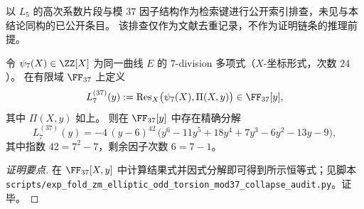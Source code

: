 \begin{remark}[公开索引一致性排查]
以 \(L_{5}\) 的高次系数片段与模 \(37\) 因子结构作为检索键进行公开索引排查，未见与本结论同构的已公开条目。
该排查仅作为文献去重记录，不作为证明链条的推理前提。
\end{remark}

\begin{conclusion}\label{con:xi-terminal-zm-elliptic-7torsion-y-image-mod37-collapse}
令 \(\psi_{7}(X)\in\ZZ[X]\) 为同一曲线 \(E\) 的 \(7\)-division 多项式（\(X\)-坐标形式，次数 \(24\)）。
在有限域 \(\FF_{37}\) 上定义
\[
L_{7}^{(37)}(y):=\operatorname{Res}_{X}\bigl(\psi_{7}(X),\Pi(X,y)\bigr)\in\FF_{37}[y],
\]
其中 \(\Pi(X,y)\) 如上。
则在 \(\FF_{37}[y]\) 中存在精确分解
\[
L_{7}^{(37)}(y)= -4\,(y-6)^{42}\,\bigl(y^{6}-11y^{5}+18y^{4}+7y^{3}-6y^{2}-13y-9\bigr),
\]
其中指数 \(42=7^{2}-7\)，剩余因子次数 \(6=7-1\)。
\end{conclusion}
\begin{proof}[证明要点]
在 \(\FF_{37}[X,y]\) 中计算结果式并因式分解即可得到所示恒等式；见脚本 \texttt{scripts/exp\_fold\_zm\_elliptic\_odd\_torsion\_mod37\_collapse\_audit.py}。证毕。
\end{proof}

